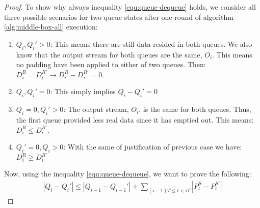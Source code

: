\begin{proof}
To show why always inequality \ref{equ:queue-dequeue} holds, we consider all
three possible scenarios for two queue states after one round of algorithm
\ref*{alg:middle-box-all} execution:
\begin{enumerate}
    \item $Q_i,Q_i' > 0$: This means there are still data resided in both
    queues.  We also know that the output stream for both queues are the same,
    $O_i$. This means no padding have been applied to either of two queues.
    Then: $D^{R}_{i} = D^{R'}_{i} \rightarrow D^{R}_{i} - D^{R'}_{i} = 0$.
    \item $Q_i,Q_i' = 0$: This simply implies $Q_{i} - Q_{i}'=0$
    \item $Q_i = 0, Q_i'>0$: The output stream, $O_i$, is the same for both
    queues. Thus, the first queue provided less real data since it has emptied
    out. This means: $D^{R}_{i} \leq D^{R'}_{i}$.
    \item $Q_i' = 0, Q_i>0$: With the same of justification of previous case we
    have:
    $D^{R}_{i} \geq D^{R'}_{i}$
\end{enumerate}
Now, using the inequality \ref{equ:queue-dequeue}, we want to prove the
following:
\begin{align}
        |Q_{i} - Q_{i}'|
        \leq
        |Q_{i-1} - Q_{i-1}'|
        +
        \sum_{(i - 1)T \leq t < iT}|P^S_t - P^{S'}_t|
\end{align}


\end{proof}

